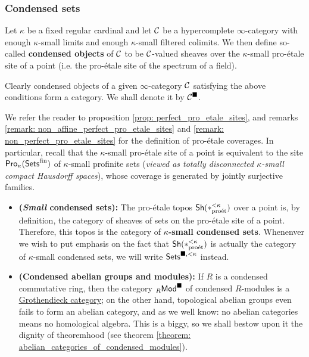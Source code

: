             \subsubsection{Condensed sets}
                \begin{definition}[Condensation] \label{def: condensation}
                    Let $\kappa$ be a fixed regular cardinal and let $\mathcal{C}$ be a hypercomplete $\infty$-category with enough $\kappa$-small limits and enough $\kappa$-small filtered colimits. We then define so-called \textbf{condensed objects} of $\mathcal{C}$ to be $\mathcal{C}$-valued sheaves over the $\kappa$-small pro-\'etale site of a point (i.e. the pro-\'etale site of the spectrum of a field). 
                    
                    Clearly condensed objects of a given $\infty$-category $\mathcal{C}$ satisfying the above conditions form a category. We shall denote it by $\mathcal{C}^{\blacksquare}$.
                \end{definition}
                \begin{remark}
                    We refer the reader to proposition \ref{prop: perfect_pro_etale_sites}, and remarks \ref{remark: non_affine_perfect_pro_etale_sites} and \ref{remark: non_perfect_pro_etale_sites} for the definition of pro-\'etale coverages. In particular, recall that the $\kappa$-small pro-\'etale site of a point is equivalent to the site $\mathsf{Pro}_{\kappa}(\mathsf{Sets}^{\mathrm{fin}})$ of $\kappa$-small profinite sets (\textit{viewed as totally disconnected $\kappa$-small compact Hausdorff spaces}), whose coverage is generated by jointly surjective families. 
                \end{remark}
                \begin{example}
                    \noindent
                    \begin{itemize}
                        \item \textbf{(\textit{Small} condensed sets):} The pro-\'etale topos $\mathsf{Sh}(*_{\mathrm{pro\acute{e}t}}^{< \kappa})$ over a point is, by definition, the category of sheaves of sets on the pro-\'etale site of a point. Therefore, this topos is the category of \textbf{$\kappa$-small condensed sets}. Whenenver we wish to put emphasis on the fact that $\mathsf{Sh}(*_{\mathrm{pro\acute{e}t}}^{< \kappa})$ is actually the category of $\kappa$-small condensed sets, we will write $\mathsf{Sets}^{\blacksquare, < \kappa}$ instead.
                        \item \textbf{(Condensed abelian groups and modules):} If $R$ is a condensed commutative ring, then the category ${}_R\mathsf{Mod}^{\blacksquare}$ of condensed $R$-modules is a \href{https://ncatlab.org/nlab/show/Grothendieck+category}{\underline{Grothendieck category}}; on the other hand, topological abelian groups even fails to form an abelian category, and as we well know: no abelian categories means no homological algebra. This is a biggy, so we shall bestow upon it the dignity of theoremhood (see theorem \ref{theorem: abelian_categories_of_condensed_modules}).
                    \end{itemize}
                \end{example}
